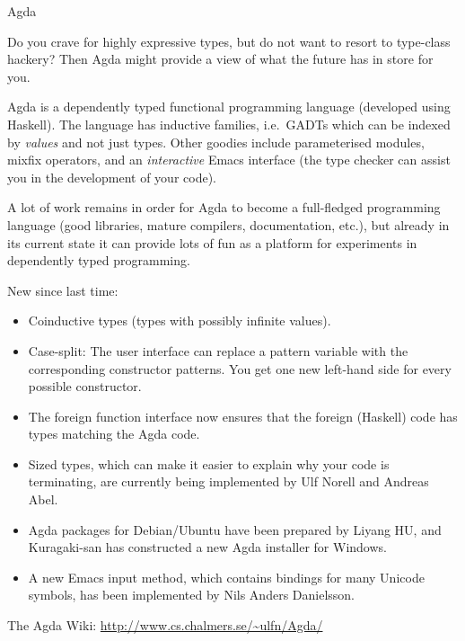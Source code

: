 \documentclass{article}
\begin{document}
\begin{hcarentry}[updated]{Agda}
\label{agda}
\makeheader

Do you crave for highly expressive types, but do not want to resort to
type-class hackery? Then Agda might provide a view of what the future
has in store for you.

Agda is a dependently typed functional programming language (developed
using Haskell). The language has inductive families, i.e.\ GADTs which
can be indexed by \emph{values} and not just types. Other goodies
include parameterised modules, mixfix operators, and an
\emph{interactive} Emacs interface (the type checker can assist you in
the development of your code).

A lot of work remains in order for Agda to become a full-fledged
programming language (good libraries, mature compilers, documentation,
etc.), but already in its current state it can provide lots of fun as
a platform for experiments in dependently typed programming.

New since last time:
\begin{itemize}
\item Coinductive types (types with possibly infinite values).
\item Case-split: The user interface can replace a pattern variable
  with the corresponding constructor patterns. You get one new
  left-hand side for every possible constructor.
\item The foreign function interface now ensures that the foreign
  (Haskell) code has types matching the Agda code.
\item Sized types, which can make it easier to explain why your code
  is terminating, are currently being implemented by Ulf Norell and
  Andreas Abel.
\item Agda packages for Debian/Ubuntu have been prepared by Liyang HU,
  and Kuragaki-san has constructed a new Agda installer for Windows.
\item A new Emacs input method, which contains bindings for many
  Unicode symbols, has been implemented by Nils Anders Danielsson.
\end{itemize}

\FurtherReading
  The Agda Wiki: \url{http://www.cs.chalmers.se/~ulfn/Agda/}
\end{hcarentry}
\end{document}
